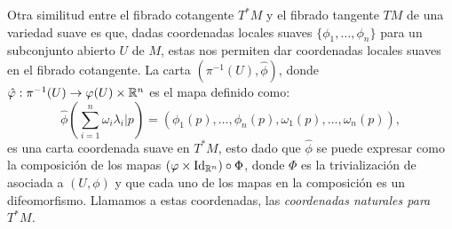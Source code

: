 Otra similitud entre el fibrado cotangente $T^{*}M$ y el fibrado tangente $TM$ de una variedad suave es que, dadas coordenadas locales suaves $\{\phi_1,\ldots,\phi_n\}$ para un subconjunto abierto $U$ de $M$, estas nos permiten dar coordenadas locales suaves en el fibrado cotangente. La carta $(\pi^{-1}(U), \hat{\phi})$, donde $\hat{\varphi}: \pi^{-1}(U) \to \varphi(U) \times \mathbb{R}^n$ es el mapa definido como:
\[
  \hat{\phi} \left(\sum_{i=1}^{n} \omega_i \lambda_i |p \right) 
  = \left(\phi_1(p), \ldots, \phi_n(p), \omega_1(p), \ldots, \omega_n(p) \right),
\]
es una carta coordenada suave en $T^{*}M$, esto dado que $\hat{\phi}$ se puede expresar como la composición de los mapas $(\varphi \times \mathrm{Id}_{\mathbb{R}^n}) \circ \Phi$, donde $\Phi$ es la trivialización de asociada a $(U,\phi)$ y que cada uno de los mapas en la composición es un difeomorfismo. Llamamos a estas coordenadas, las \it{coordenadas naturales para $T^{*}M$}.
